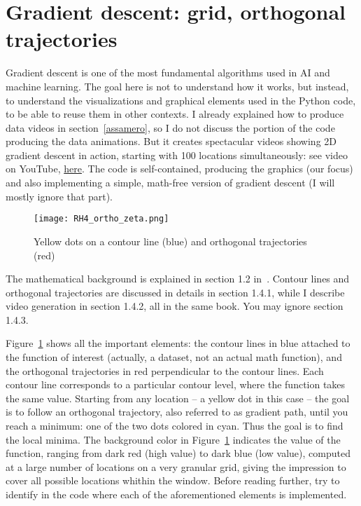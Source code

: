 \documentclass[oneside,10pt]{book}
\begin{document}
\section{Gradient descent: grid, orthogonal trajectories}\label{poures}

Gradient descent is one of the most fundamental algorithms used in AI and machine learning. The goal here is not to understand how it works, but instead,
 to understand the visualizations and graphical elements used in the Python code, to be able to reuse them in other contexts. I already explained how to produce data videos in section~\ref{assamero},
 so I do not discuss  the portion of the code producing the data animations. But it creates spectacular videos showing 2D gradient descent in action, starting with 100 locations
 simultaneously: see video on YouTube, \href{https://www.youtube.com/watch?v=pqQsLpPkvbw}{here}. 
The code is self-contained, producing the graphics (our focus) and also implementing a simple, math-free version of 
\textcolor{index}{gradient descent} (I will mostly ignore that part).   

\begin{figure}[H]
\centering
\texttt{[image: RH4\_ortho\_zeta.png]}   
\caption{Yellow dots on a contour line (blue) and orthogonal trajectories (red)}
\label{ringhouls}
\end{figure}

The mathematical background is explained in section 1.2 in~\cite{vgmloptim}. Contour lines and orthogonal trajectories are discussed in details in section 1.4.1, 
while I describe video generation in section 1.4.2, all in the same book. You may ignore section 1.4.3. 

Figure~\ref{ringhouls} shows all the important elements: the \textcolor{index}{contour lines} in blue attached 
to the function of interest (actually, a dataset, not an actual math function), and the 
\textcolor{index}{orthogonal trajectories} in red perpendicular to 
the contour lines. Each contour line corresponds to a particular \textcolor{index}{contour level}, where the function takes the same value. Starting from any location
 -- a yellow dot in this case -- the goal is to follow an orthogonal trajectory, also referred to as \textcolor{index}{gradient path},  
until you reach a minimum: one of the two dots colored in cyan. Thus the goal is to find the local minima. 
The background color in Figure~\ref{ringhouls} indicates the value of the function,
 ranging from dark red (high value) to dark blue (low value), computed at a large number of locations on a very granular grid, giving the
 impression to cover all possible locations whithin the window.  Before reading further, try to identify in the code where each of the aforementioned 
elements is implemented. 
\end{document}
